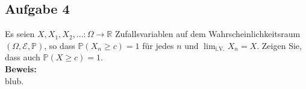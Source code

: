 \documentclass[11pt,a4paper,ngerman]{article}
\newcommand{\Prob}{\mathbb{P}}
\begin{document}
\subsection*{Aufgabe 4}

Es seien $X, X_1, X_2, ... : \Omega \rightarrow \mathbb{R}$ Zufallsvariablen auf dem Wahrscheinlichkeitsraum $(\Omega, \mathcal{E}, \Prob)$,
so dass $\Prob(X_n \geq c) = 1$ für jedes $n$ und $\lim_{\text{i.V.}}X_n = X$. Zeigen Sie, dass auch $\Prob(X \geq c) = 1$.\\

\textbf{Beweis:}\\

blub.

\label{LastPage}
\end{document}
